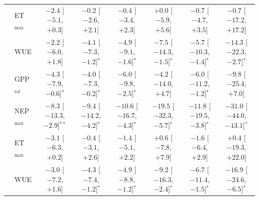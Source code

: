 \begin{table}[htbp]
{\begin{tabular}{llcccccc}
 & ET$_\mathrm{max}$ & $-2.4$ {\tiny[$-5.1$, $+0.3$]} & $-0.2$ {\tiny[$-2.6$, $+2.1$]} & $-0.4$ {\tiny[$-3.4$, $+2.3$]} & $+0.0$ {\tiny[$-5.9$, $+5.6$]} & $-0.7$ {\tiny[$-4.7$, $+3.5$]} & $-0.7$ {\tiny[$-17.2$, $+17.2$]} \\
 & WUE & $-2.2$ {\tiny[$-6.0$, $+1.8$]} & $-4.1$ {\tiny[$-7.3$, $-1.2$]}$^{*}$ & $-4.9$ {\tiny[$-9.1$, $-1.6$]}$^{*}$ & $-7.5$ {\tiny[$-14.3$, $-1.5$]}$^{*}$ & $-5.7$ {\tiny[$-10.3$, $-1.4$]}$^{*}$ & $-14.3$ {\tiny[$-22.3$, $-2.7$]}$^{*}$ \\
\midrule
{} & GPP$_\mathrm{sat}$ & $-4.3$ {\tiny[$-7.9$, $-0.6$]}$^{*}$ & $-4.0$ {\tiny[$-7.3$, $-0.2$]}$^{*}$ & $-6.0$ {\tiny[$-9.8$, $-2.5$]}$^{*}$ & $-4.2$ {\tiny[$-14.0$, $+4.7$]} & $-6.0$ {\tiny[$-11.2$, $-1.2$]}$^{*}$ & $-9.8$ {\tiny[$-25.4$, $+7.0$]} \\
 & NEP$_\mathrm{max}$ & $-8.3$ {\tiny[$-13.3$, $-2.9$]}$^{**}$ & $-9.4$ {\tiny[$-14.2$, $-4.2$]}$^{*}$ & $-10.6$ {\tiny[$-16.7$, $-4.3$]}$^{*}$ & $-19.5$ {\tiny[$-32.3$, $-5.7$]}$^{*}$ & $-11.8$ {\tiny[$-19.5$, $-3.8$]}$^{*}$ & $-31.0$ {\tiny[$-44.0$, $-13.1$]}$^{*}$ \\
 & ET$_\mathrm{max}$ & $-3.1$ {\tiny[$-6.3$, $+0.2$]} & $-0.4$ {\tiny[$-3.1$, $+2.6$]} & $-1.4$ {\tiny[$-5.1$, $+2.2$]} & $+0.6$ {\tiny[$-7.8$, $+7.9$]} & $-1.6$ {\tiny[$-6.4$, $+2.9$]} & $+0.4$ {\tiny[$-19.3$, $+22.0$]} \\
 & WUE & $-3.0$ {\tiny[$-7.2$, $+1.6$]} & $-4.3$ {\tiny[$-7.4$, $-1.2$]}$^{*}$ & $-4.9$ {\tiny[$-8.8$, $-1.2$]}$^{*}$ & $-9.2$ {\tiny[$-16.3$, $-2.4$]}$^{*}$ & $-6.7$ {\tiny[$-11.4$, $-1.5$]}$^{*}$ & $-16.9$ {\tiny[$-24.6$, $-6.5$]}$^{*}$ \\
\bottomrule
\end{tabular}}
\end{table}
